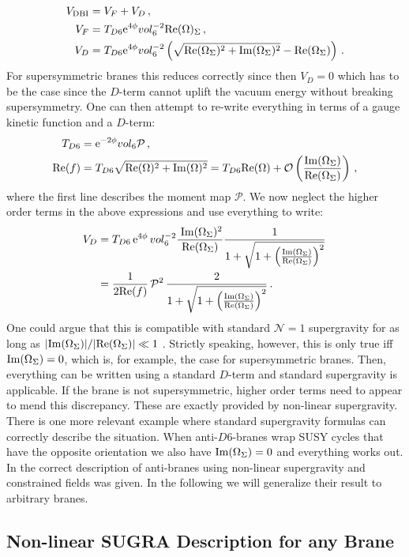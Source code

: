 \documentclass[12pt]{report}
\newcommand{\bea}{\begin{equation}\begin{aligned}}
\newcommand{\eea}{\end{aligned}\end{equation}}
\def\rme{{\rm e}}
\def\rmre{{\rm Re}}
\def\rmim{{\rm Im}}
\begin{document}
\bea
V_{\text{DBI}} &= V_F + V_D\,,\\
V_F &= T_{D6} \rme^{4 \phi} vol_6^{-2} \rmre (\Omega)_\Sigma\,,\\
V_D &= T_{D6} \rme^{4 \phi} vol_6^{-2} \left( \sqrt{\rmre(\Omega_\Sigma)^2 + \rmim(\Omega_\Sigma)^2} - \rmre (\Omega_\Sigma)\right)\,.
\eea
For supersymmetric branes this reduces correctly since then $V_D = 0$ which has to be the case since the $D$-term cannot uplift the vacuum energy without breaking supersymmetry. One can then attempt to re-write everything in terms of a gauge kinetic function and a $D$-term:
\bea 
T_{D6} &= \rme^{-2\phi}vol_6 \mathcal{P}\,,\\
\rmre(f) &= T_{D6} \sqrt{\rmre(\Omega)^2+\rmim(\Omega)^2} = T_{D6} \rmre(\Omega) + \mathcal{O} \left(\frac{\rmim(\Omega_\Sigma)}{\rmre(\Omega_\Sigma)}\right)\,,
\eea
where the first line describes the moment map $\mathcal{P}$. We now neglect the higher order terms in the above expressions and use everything to write:
\bea 
V_D &= T_{D6} \, \rme^{4 \phi} \, vol_6^{-2} \frac{\;\rmim(\Omega_\Sigma)^2}{\rmre(\Omega_\Sigma)} \frac{1}{1+\sqrt{1+\left(\frac{\rmim(\Omega_\Sigma)}{\rmre(\Omega_\Sigma)}\right)^2}}\,\\
&= \frac{1}{2\rmre(f)} \, \mathcal{P}^2 \, \frac{2}{1+\sqrt{1+\left(\frac{\rmim(\Omega_\Sigma)}{\rmre(\Omega_\Sigma)}\right)^2}}\,.
\eea
One could argue that this is compatible with standard $\mathcal{N}=1$ supergravity for as long as $|\rmim(\Omega_\Sigma)|/|\rmre(\Omega_\Sigma)| \ll 1$ \cite{Villadoro:2006ia}. Strictly speaking, however, this is only true iff $\rmim(\Omega_\Sigma) = 0$, which is, for example, the case for supersymmetric branes. Then, everything can be written using a standard $D$-term and standard supergravity is applicable. If the brane is not supersymmetric, higher order terms need to appear to mend this discrepancy. These are exactly provided by non-linear supergravity. There is one more relevant example where standard supergravity formulas can correctly describe the situation. When anti-$D6$-branes wrap SUSY cycles that have the opposite orientation we also have $\rmim(\Omega_\Sigma)=0$ and everything works out. In \cite{Kallosh:2018nrk} the correct description of anti-branes using non-linear supergravity and constrained fields was given. In the following we will generalize their result to arbitrary branes.

\subsection{Non-linear SUGRA Description for any Brane}
\end{document}
